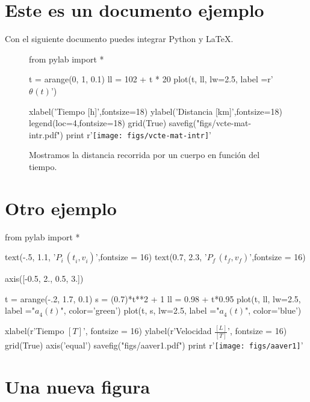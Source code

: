 \documentclass[12pt]{report}
\begin{document}
\section{Este es un documento ejemplo}

Con el siguiente documento puedes integrar Python y \LaTeX.

\begin{figure}[H]\centering%
\begin{python}
from pylab import *
	
t = arange(0, 1, 0.1)
ll = 102 + t * 20
plot(t, ll, lw=2.5, label =r'${\theta}_{}^{}(t) $')

xlabel('Tiempo [h]',fontsize=18)
ylabel('Distancia [km]',fontsize=18)
legend(loc=4,fontsize=18)
grid(True)
savefig("figs/vcte-mat-intr.pdf")
print r'\texttt{[image: figs/vcte-mat-intr]}'

\end{python}
\caption{\label{fig:vcte-mat-intr}
Mostramos la distancia recorrida por un cuerpo en funci\'on del 
tiempo.}
  \end{figure}



\section{Otro ejemplo}


\begin{python}
from pylab import *

text(-.5, 1.1, '$P_i^{}\, (t_{i}^{},v_{i}^{})$',fontsize = 16)
text(0.7, 2.3, '$P_f^{} \,(t_{f}^{},v_{f}^{})$',fontsize = 16)

axis([-0.5, 2., 0.5, 3.])

t = arange(-.2, 1.7, 0.1)
s = (0.7)*t**2 + 1
ll = 0.98 + t*0.95
plot(t, ll, lw=2.5, label ="$a_{4}^{}(t)$", color='green')
plot(t, s, lw=2.5, label ="$a_{4}^{}(t)$", color='blue')

xlabel(r'Tiempo $[T]$', fontsize = 16)
ylabel(r'Velocidad $\frac{[L]}{[T]}$', fontsize = 16)
grid(True)
axis('equal')
savefig("figs/aaver1.pdf")
print r'\texttt{[image: figs/aaver1]}'
\end{python}



\section{Una nueva figura}
\end{document}
